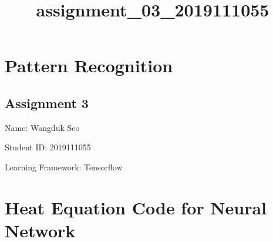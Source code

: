 \documentclass[11pt]{article}
\title{assignment\_03\_2019111055}
\begin{document}
    
    
    \maketitle
    
    

    
    \hypertarget{pattern-recognition}{%
\section{Pattern Recognition}\label{pattern-recognition}}

\hypertarget{assignment-3}{%
\subsection{Assignment 3}\label{assignment-3}}

Name: Wangduk Seo

Student ID: 2019111055

Learning Framework: Tensorflow

    \hypertarget{heat-equation-code-for-neural-network}{%
\section{Heat Equation Code for Neural
Network}\label{heat-equation-code-for-neural-network}}
\end{document}
